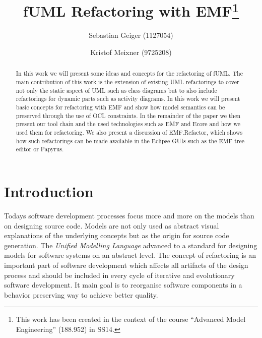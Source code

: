\documentclass{llncs}
\begin{document}
\pagestyle{plain}

\title{fUML Refactoring with EMF\footnote{This work has been created in the context of the course ``Advanced Model Engineering'' (188.952) in SS14.}}

\author{Sebastian Geiger (1127054) \and Kristof Meixner (9725208)}

\maketitle

\begin{abstract}
In this work we will present some ideas and concepts for the refactoring of fUML. The main contribution of this work is the extension of
existing UML refactorings to cover not only the static aspect of UML such as class diagrams but to also include refactorings for dynamic
parts such as activity diagrams. In this work we will present basic concepts for refactoring with EMF and show how model semantics can be
preserved through the use of OCL constraints. In the remainder of the paper we then present our tool chain and the used technologies
such as EMF and Ecore and how we used them for refactoring. We also present a discussion of EMF.Refactor, which shows how such refactorings
can be made available in the Eclipse GUIs such as the EMF tree editor or Papyrus.
\end{abstract}

\tableofcontents
\newpage


\section{Introduction}
Todays software development processes focus more and more on the models than on designing source code. Models are not 
only used as abstract visual explanations of the underlying concepts but as the origin for source code generation. The 
\textit{Unified Modelling Language} advanced to a standard for designing models for software systems on an abstract level. The concept 
of refactoring is an important part of software development which affects all artifacts of the design process and should be included 
in every cycle of iterative and evolutionary software development. It main goal is to reorganise software components in a behavior 
preserving way \cite{mast:REFOOF} to achieve better quality.
\end{document}
